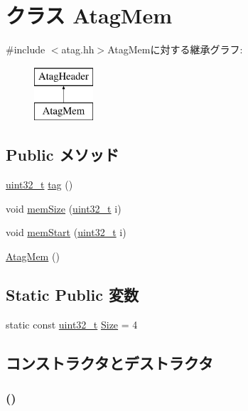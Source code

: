 \hypertarget{classAtagMem}{
\section{クラス AtagMem}
\label{classAtagMem}
}


{\ttfamily \#include $<$atag.hh$>$}AtagMemに対する継承グラフ:\begin{figure}[H]
\begin{center}
\leavevmode
\includegraphics[height=2cm]{classAtagMem}
\end{center}
\end{figure}
\subsection*{Public メソッド}
\begin{DoxyCompactItemize}
\item 
\hyperlink{Type_8hh_a435d1572bf3f880d55459d9805097f62}{uint32\_\-t} \hyperlink{classAtagMem_afe29fbb80b1d2765e37e98c6d259ea52}{tag} ()
\item 
void \hyperlink{classAtagMem_a90062018f5fdfc088eec2f2de8e85aa2}{memSize} (\hyperlink{Type_8hh_a435d1572bf3f880d55459d9805097f62}{uint32\_\-t} i)
\item 
void \hyperlink{classAtagMem_a1cac14faf981166796e6deb5c3d2dbdc}{memStart} (\hyperlink{Type_8hh_a435d1572bf3f880d55459d9805097f62}{uint32\_\-t} i)
\item 
\hyperlink{classAtagMem_a232435fb9e747c601952cbed54f48040}{AtagMem} ()
\end{DoxyCompactItemize}
\subsection*{Static Public 変数}
\begin{DoxyCompactItemize}
\item 
static const \hyperlink{Type_8hh_a435d1572bf3f880d55459d9805097f62}{uint32\_\-t} \hyperlink{classAtagMem_a7ecea14dd0f3277e19580d4509fafdba}{Size} = 4
\end{DoxyCompactItemize}


\subsection{コンストラクタとデストラクタ}
\hypertarget{classAtagMem_a232435fb9e747c601952cbed54f48040}{
\subsubsection[{AtagMem}]{ ()}}
\label{classAtagMem_a232435fb9e747c601952cbed54f48040}




